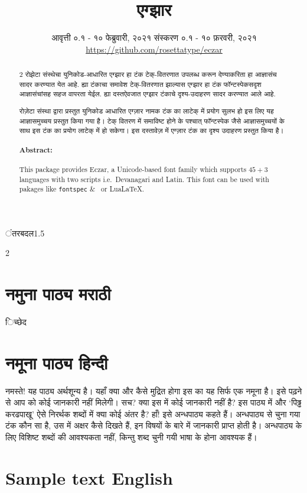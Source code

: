 \documentclass[10pt]{article}
\title{एग्झार}
\author{}
\date{%
  आवृत्ती ०.१ - १० फेब्रुवारी, २०२१
  \hfill
  संस्करण ०.१ - १० फ़रवरी, २०२१\\
  \bigskip
  {\small\faIcon{gitlab}\quad\url{https://github.com/rosettatype/eczar}}
}%
\begin{document}
\maketitle

\vfill

\अंतरबदल{1.5}
\begin{abstract}
  \begin{multicols}{2}
    रोझेटा संस्थेचा युनिकोड-आधारित एग्झार हा टंक टेक्-वितरणात उपलब्ध करून देण्याकरिता हा
    आज्ञासंच सादर करण्यात येत आहे. ह्या टंकाचा समावेश टेक्-वितरणात झाल्यास एग्झार हा टंक
    फॉन्टस्पेकसदृश आज्ञासंचांसह सहज वापरता येईल. ह्या दस्तऐवजात एग्झार टंकाचे दृश्य-उदाहरण सादर
    करण्यात आले आहे.
    
    \columnbreak
    रोज़ेटा संस्था द्वारा प्रस्तुत युनिकोड आधारित एग्ज़ार नामक टंक का लाटेक् में प्रयोग सुलभ हो इस
    लिए यह आज्ञासमुच्चय प्रस्तुत किया गया है। टेक् वितरण में समाविष्ट होने के पश्चात् फॉन्टस्पेक जैसे
    आज्ञासमुच्चयों के साथ इस टंक का प्रयोग लाटेक् में हो सकेगा। इस दस्तावेज़ में एग्ज़ार टंक का दृश्य
    उदाहरण प्रस्तुत किया है।
  \end{multicols}

  \paragraph{Abstract:} This package provides Eczar, a Unicode-based font family
  which supports $45+3$ languages with two scripts i.e.\ Devanagari and
  Latin. This font can be used with pakages like \verb|fontspec| \& \XeLaTeX\ or
  Lua\LaTeX.
\end{abstract}
\vfill
\clearpage\pagebreak

\begin{multicols}{2}
  \section*{नमुना पाठ्य मराठी}
  िच्छेद

  \columnbreak
  \section*{नमूना पाठ्य हिन्दी}
  नमस्ते! यह पाठ्य अर्थशून्य है। यहाँ क्या और कैसे मुद्रित होगा इस का यह सिर्फ एक नमूना है। इसे
  पढ़ने से आप को कोई जानकारी नहीं मिलेगी। सच? क्या इस में कोई जानकारी नहीं है? इस पाठ्य में और
  `पिढ्ढ करढपाखू' ऐसे निरर्थक शब्दों में क्या कोई अंतर है? हाँ! इसे अन्धपाठ्य कहते हैं। अन्धपाठ्य से
  चुना गया टंक कौन सा है, उस में अक्षर कैसे दिखते हैं, इन विषयों के बारे में जानकारी प्राप्त होती है।
  अन्धपाठ्य के लिए विशिष्ट शब्दों की आवश्यकता नहीं, किन्तु शब्द चुनी गयी भाषा के होना आवश्यक हैं।
\end{multicols}
\section*{Sample text English}
\kant[1]
\end{document}
